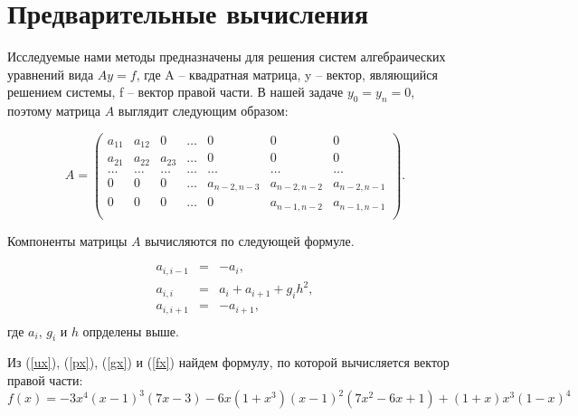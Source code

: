\section{Предварительные вычисления}

Исследуемые нами методы предназначены для решения систем алгебраических уравнений вида $Ay=f$, где A -- квадратная матрица, y -- вектор, являющийся решением системы, f -- вектор правой части.
В нашей задаче $y_0 = y_n = 0$,  поэтому матрица $A$ выглядит следующим образом:

$$
	A = 
	\left(
	\begin{array}{ccccccc}
		a_{1 1}&a_{1 2}&0&\dots&0&0&0\\
		a_{2 1}&a_{2 2}&a_{2 3}&\dots&0&0&0\\
		\dots&\dots&\dots&\dots&\dots&\dots&\dots\\
		0&0&0&\dots&a_{n-2, n-3}&a_{n-2, n-2}&a_{n-2, n-1}\\
		0&0&0&\dots&0&a_{n-1, n-2}&a_{n-1, n-1}\\
	\end{array}
	\right).
$$

Компоненты матрицы $A$ вычисляются по следующей формуле.

\begin{equation}
	\begin{array}{rcl}
		a_{i,i-1}&=&-a_i,\\
		a_{i, i}&=&a_i+a_{i+1}+g_ih^2,\\
		a_{i, i+1}&=&-a_{i+1},\\
	\end{array}
\end{equation}
где $a_i$, $g_i$ и $h$ опрделены выше.

Из (\ref{ux}), (\ref{px}), (\ref{gx}) и (\ref{fx}) найдем формулу, по которой вычисляется вектор правой части: $$f(x) = -3x^4(x-1)^3(7x-3)-6x(1+x^3)(x-1)^2(7x^2-6x+1)+(1+x)x^3(1-x)^4$$